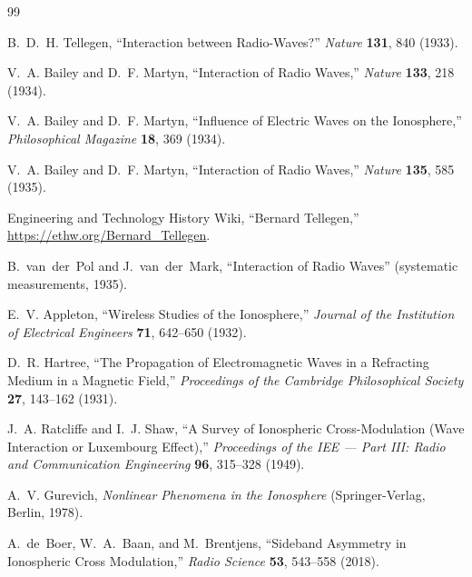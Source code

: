 \documentclass[12pt]{article}
\begin{document}
\begin{thebibliography}{99}

B.~D.~H. Tellegen,
``Interaction between Radio-Waves?''
\emph{Nature} \textbf{131}, 840 (1933).

V.~A. Bailey and D.~F. Martyn,
``Interaction of Radio Waves,''
\emph{Nature} \textbf{133}, 218 (1934).

V.~A. Bailey and D.~F. Martyn,
``Influence of Electric Waves on the Ionosphere,''
\emph{Philosophical Magazine} \textbf{18}, 369 (1934).

V.~A. Bailey and D.~F. Martyn,
``Interaction of Radio Waves,''
\emph{Nature} \textbf{135}, 585 (1935).

Engineering and Technology History Wiki,
``Bernard Tellegen,''
\url{https://ethw.org/Bernard_Tellegen}.

B.~van~der~Pol and J.~van~der~Mark,
``Interaction of Radio Waves'' (systematic measurements, 1935).

E.~V. Appleton,
``Wireless Studies of the Ionosphere,''
\emph{Journal of the Institution of Electrical Engineers}
\textbf{71}, 642--650 (1932).

D.~R. Hartree,
``The Propagation of Electromagnetic Waves in a Refracting Medium in a Magnetic Field,''
\emph{Proceedings of the Cambridge Philosophical Society}
\textbf{27}, 143--162 (1931).

J.~A. Ratcliffe and I.~J. Shaw,
``A Survey of Ionospheric Cross-Modulation (Wave Interaction or Luxembourg Effect),''
\emph{Proceedings of the IEE --- Part III: Radio and Communication Engineering}
\textbf{96}, 315--328 (1949).

A.~V. Gurevich,
\emph{Nonlinear Phenomena in the Ionosphere}
(Springer-Verlag, Berlin, 1978).

A.~de~Boer, W.~A.~Baan, and M.~Brentjens,
``Sideband Asymmetry in Ionospheric Cross Modulation,''
\emph{Radio Science} \textbf{53}, 543--558 (2018).

\end{thebibliography}
\end{document}
